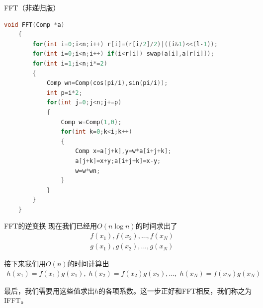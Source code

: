 \documentclass{beamer}
\begin{document}
\begin{frame}[fragile]{FFT（非递归版）}
    \begin{lstlisting}[language=c++]
    void FFT(Comp *a)
    {
        for(int i=0;i<n;i++) r[i]=(r[i/2]/2)|((i&1)<<(l-1));
        for(int i=0;i<n;i++) if(i<r[i]) swap(a[i],a[r[i]]);
        for(int i=1;i<n;i*=2)
        {
            Comp wn=Comp(cos(pi/i),sin(pi/i));
            int p=i*2;
            for(int j=0;j<n;j+=p)
            {
                Comp w=Comp(1,0);
                for(int k=0;k<i;k++)
                {
                    Comp x=a[j+k],y=w*a[i+j+k];
                    a[j+k]=x+y;a[i+j+k]=x-y;
                    w=w*wn;
                }
            }
        }
    }
    \end{lstlisting}
\end{frame}

\begin{frame}{FFT的逆变换}
    现在我们已经用$O(n\log n)$的时间求出了
    \begin{align*}
        & f(x_1), f(x_2), ..., f(x_N)\\
        & g(x_1), g(x_2), ..., g(x_N)
    \end{align*}

    接下来我们用$O(n)$的时间计算出
    \begin{align*}
        h(x_1)=f(x_1)g(x_1),\;h(x_2)=f(x_2)g(x_2),...,\;h(x_N)=f(x_N)g(x_N)
    \end{align*}

    最后，我们需要用这些值求出$h$的各项系数。这一步正好和FFT相反，我们称之为IFFT。
\end{frame}
\end{document}
